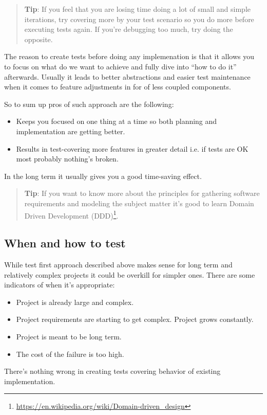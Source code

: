 \begin{quote}\textbf{Tip}: If you feel that you are losing time doing a lot of small and simple iterations, try covering more by your
test scenario so you do more before executing tests again. If you're debugging too much, try doing the opposite.

\end{quote}
The reason to create tests before doing any implemenation is that it allows you to focus on what do we want to achieve
and fully dive into ``how to do it'' afterwards. Usually it leads to better abstractions and easier test maintenance when
it comes to feature adjustments in for of less coupled components.

So to sum up pros of such approach are the following:

\begin{itemize}
\item Keeps you focused on one thing at a time so both planning and implementation are getting better.
\item Results in test-covering more features in greater detail i.e. if tests are OK most probably nothing's broken.
\end{itemize}
In the long term it usually gives you a good time-saving effect.

\begin{quote}\textbf{Tip}: If you want to know more about the principles for gathering software requirements and modeling the subject
matter it's good to learn Domain Driven Development (DDD)\footnote{\url{https://en.wikipedia.org/wiki/Domain-driven\_design}}.

\end{quote}
\subsection{When and how to test}
While test first approach described above makes sense for long term and relatively complex projects it could be overkill
for simpler ones. There are some indicators of when it's appropriate:

\begin{itemize}
\item Project is already large and complex.
\item Project requirements are starting to get complex. Project grows constantly.
\item Project is meant to be long term.
\item The cost of the failure is too high.
\end{itemize}
There's nothing wrong in creating tests covering behavior of existing implementation.

